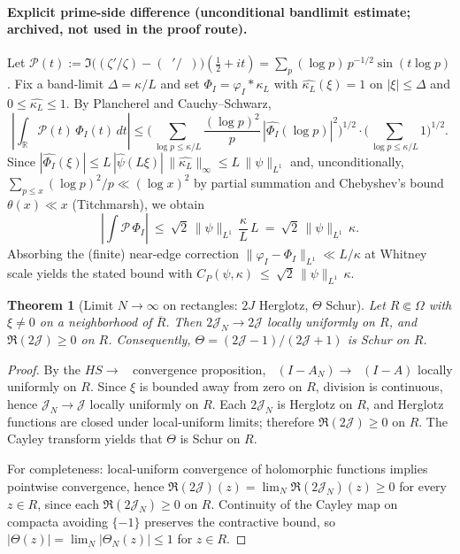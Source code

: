 \documentclass[11pt]{article}
\newtheorem{theorem}{Theorem}
\theoremstyle{definition}
\theoremstyle{remark}
\newcommand{\R}{\mathbb{R}}
\DeclareMathOperator{\dettwo}{det_2}
\begin{document}
\paragraph{Explicit prime-side difference (unconditional bandlimit estimate; archived, not used in the proof route).}
Let $\mathcal P(t):=\Im\big((\zeta'/\zeta)-(\dettwo'/\dettwo)\big)(\tfrac12+it)=\sum_{p}(\log p)\,p^{-1/2}\sin(t\log p)$. Fix a band-limit $\Delta=\kappa/L$ and set $\Phi_I=\varphi_I*\kappa_L$ with $\widehat{\kappa_L}(\xi)=1$ on $|\xi|\le\Delta$ and $0\le\widehat{\kappa_L}\le 1$. By Plancherel and Cauchy–Schwarz,
\[
 \left|\int_\R \!\mathcal P(t)\,\Phi_I(t)\,dt\right|
 \le \Bigg(\sum_{\log p\le \kappa/L}\frac{(\log p)^2}{p}\,|\widehat{\Phi_I}(\log p)|^2\Bigg)^{\!1/2}
 \cdot\Bigg(\sum_{\log p\le \kappa/L}1\Bigg)^{\!1/2}.
\]
Since $|\widehat{\Phi_I}(\xi)|\le L\,|\widehat{\psi}(L\xi)|\,\|\widehat{\kappa_L}\|_\infty\le L\,\|\psi\|_{L^1}$ and, unconditionally, $\sum_{p\le x}(\log p)^2/p\ll (\log x)^2$ by partial summation and Chebyshev's bound $\theta(x)\ll x$ (Titchmarsh), we obtain
\[
 \left|\int \!\mathcal P\,\Phi_I\right|\ \le\ \sqrt{2}\,\|\psi\|_{L^1}\,\frac{\kappa}{L}\,L\ =\ \sqrt{2}\,\|\psi\|_{L^1}\,\kappa.
\]
Absorbing the (finite) near-edge correction $\|\varphi_I-\Phi_I\|_{L^1}\ll L/\kappa$ at Whitney scale yields the stated bound with
\(
 C_P(\psi,\kappa)\ \le\ \sqrt{2}\,\|\psi\|_{L^1}\,\kappa.
\)
\begin{theorem}[Limit \(N\to\infty\) on rectangles: \(2J\) Herglotz, \(\Theta\) Schur]\label{thm:limit-rect}
Let \(R\Subset\Omega\) with \(\xi\neq 0\) on a neighborhood of \(\overline R\). Then \(2\mathcal J_N\to 2\mathcal J\) locally uniformly on \(R\), and \(\Re(2\mathcal J)\ge 0\) on \(R\). Consequently, \(\Theta=(2\mathcal J-1)/(2\mathcal J+1)\) is Schur on \(R\).
\end{theorem}
\begin{proof}
By the \(HS\to\dettwo\) convergence proposition, $\dettwo(I-A_N)\to \dettwo(I-A)$ locally uniformly on $R$. Since $\xi$ is bounded away from zero on $R$, division is continuous, hence $\mathcal J_N\to \mathcal J$ locally uniformly on $R$. Each $2\mathcal J_N$ is Herglotz on $R$, and Herglotz functions are closed under local-uniform limits; therefore $\Re(2\mathcal J)\ge 0$ on $R$. The Cayley transform yields that $\Theta$ is Schur on $R$.

For completeness: local-uniform convergence of holomorphic functions implies pointwise convergence, hence $\Re(2\mathcal J)(z)=\lim_N \Re(2\mathcal J_N)(z)\ge 0$ for every $z\in R$, since each $\Re(2\mathcal J_N)\ge 0$ on $R$. Continuity of the Cayley map on compacta avoiding $\{-1\}$ preserves the contractive bound, so $|\Theta(z)|=\lim_N |\Theta_N(z)|\le 1$ for $z\in R$.
\end{proof}
\end{document}
